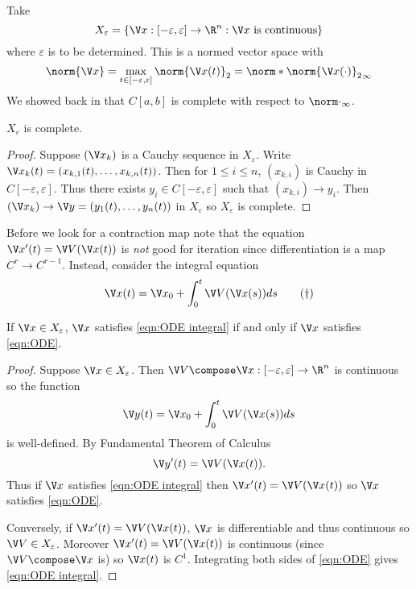 \documentclass[a4paper]{article}
\theoremstyle{definition}
\begin{document}
Take
\[
  X_\varepsilon = \{\V x: [-\varepsilon, \varepsilon] \to \R^n : \V x \text{ is continuous} \}
\]
where \(\varepsilon\) is to be determined. This is a normed vector space with
\[
  \norm{\V x} = \max_{t \in [-\varepsilon, \varepsilon]}\norm{\V x(t)}_2 = \norm*{\norm{\V x(\cdot)}_2}_\infty
\]
We showed back in  that \(C[a, b]\) is complete with respect to \(\norm \cdot_\infty\).

\begin{corollary}
  \(X_\varepsilon\) is complete.
\end{corollary}

\begin{proof}
  Suppose \((\V x_k)\) is a Cauchy sequence in \(X_\varepsilon\). Write \(\V x_k(t) = (x_{k, 1}(t), \dots, x_{k, n}(t))\). Then for \(1 \leq i \leq n\), \((x_{k, i})\) is Cauchy in \(C[-\varepsilon, \varepsilon]\). Thus there exists \(y_i \in C[-\varepsilon, \varepsilon]\) such that \((x_{k, i}) \to y_i\). Then \((\V x_k) \to \V y = (y_1(t), \dots, y_n(t))\) in \(X_\varepsilon\) so \(X_\varepsilon\) is complete.
\end{proof}

Before we look for a contraction map note that the equation \(\V x'(t) = \V V(\V x(t))\) is \emph{not} good for iteration since differentiation is a map \(C^r \to C^{r - 1}\). Instead, consider the integral equation
\begin{equation*}
  \label{eqn:ODE integral}
  \V x(t) = \V x_0 + \int_0^t \V V(\V x(s)) ds
  \tag{\(\dag\)}
\end{equation*}

\begin{proposition}
  If \(\V x \in X_\varepsilon\), \(\V x\) satisfies \eqref{eqn:ODE integral} if and only if \(\V x\) satisfies \eqref{eqn:ODE}.
\end{proposition}

\begin{proof}
  Suppose \(\V x \in X_\varepsilon\). Then \(\V V \compose \V x: [-\varepsilon, \varepsilon] \to \R^n\) is continuous so the function
  \[
    \V y(t) = \V x_0 + \int_{0}^{t} \V V(\V x(s)) ds
  \]
  is well-defined. By Fundamental Theorem of Calculus
  \[
    \V y'(t) = \V V(\V x(t)).
  \]
  Thus if \(\V x\) satisfies \eqref{eqn:ODE integral} then \(\V x'(t) = \V V(\V x(t))\) so \(\V x\) satisfies \eqref{eqn:ODE}.

  Conversely, if \(\V x'(t) = \V V(\V x(t))\), \(\V x\) is differentiable and thus continuous so \(\V V \in X_\varepsilon\). Moreover \(\V x'(t) = \V V(\V x(t))\) is continuous (since \(\V V \compose \V x\) is) so \(\V x(t)\) is \(C^1\). Integrating both sides of \eqref{eqn:ODE} gives \eqref{eqn:ODE integral}.
\end{proof}
\end{document}
